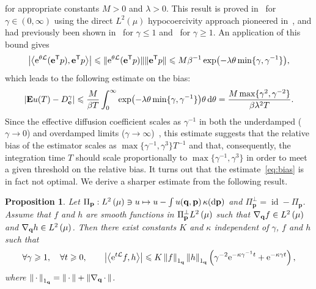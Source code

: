 \documentclass[11pt,a4paper]{article}
\DeclareMathOperator{\id}{id}
\newcommand{\e}{\mathrm{e}}
\newcommand{\dummy}{\,\cdot\,}
\newcommand{\expect}[0]{\mathbf{E}}
\newcommand{\grad}{\nabla}
\newcommand{\vect}[1]{\boldsymbol{\mathbf #1}}
\renewcommand{\d}{\mathrm d}
\renewcommand{\t}{\mathsf T}
\theoremstyle{plain}
\newtheorem{proposition}{Proposition}[section]
\numberwithin{equation}{section}
\renewcommand{\leq}{\leqslant}
\renewcommand{\geq}{\geqslant}
\begin{document}
for appropriate constants $M > 0$ and $\lambda > 0$.
This result is proved in~\cite{roussel2018spectral} for $\gamma \in (0, \infty)$ using the direct $L^2(\mu)$ hypocoercivity approach pioneered in~\cite{MR2576899,MR3324910},
and had previously been shown in~\cite{MR2394704} for $\gamma \leq 1$ and~\cite{LMS16} for $\gamma \geq 1$.
An application of this bound gives
\[
    \left\lvert \ip{\e^{\theta \mathcal L}(\vect e^\t p)}{\vect e^\t p} \right\rvert
    \leq \norm*{\e^{\theta \mathcal L}(\vect e^\t p)} \norm*{\vect e^\t p}
    \leq M \beta^{-1} \exp\bigl(- \lambda \theta \min\{\gamma, \gamma^{-1}\}\bigr),
\]
which leads to the following estimate on the bias:
\begin{equation}
    \label{eq:bias}
    \abs{\expect u(T) - D_{\vect e}^{\gamma}}
    \leq \frac{M}{\beta T}\int_{0}^{\infty} \exp\bigl(- \lambda \theta \min\{\gamma, \gamma^{-1}\}\bigr) \theta \, \d \theta
    = \frac{M \max \{\gamma^2, \gamma^{-2}\}}{\beta \lambda^2 T}.
\end{equation}
Since the effective diffusion coefficient scales as $\gamma^{-1}$ in both the underdamped ($\gamma \to 0$) and overdamped limits ($\gamma \to \infty$)~\cite{MR2394704,MR2427108},
this estimate suggests that the relative bias of the estimator scales as $\max\{\gamma^{-1}, \gamma^3\} T^{-1}$ and that,
consequently, the integration time $T$ should scale proportionally to $\max\{\gamma^{-1}, \gamma^3\}$ in order to meet a given threshold on the relative bias.
It turns out that the estimate~\eqref{eq:bias} is in fact not optimal.
We derive a sharper estimate from the following result.
\begin{proposition}
    \label{proposition:semigroup_meanzero_observable}
    Let $\Pi_{\vect p}: \lp{2}{\mu} \ni u \mapsto  u - \int u(\vect q, \vect p) \, \kappa(\d \vect p)$ and $\Pi_{\vect p}^\perp = \id - \Pi_{\vect p}$.
    Assume that $f$ and $h$ are smooth functions in $\Pi_{\vect p}^\perp \lp{2}{\mu}$
    such that $\grad_{\vect q} f \in \lp{2}{\mu}$ and $\grad_{\vect q} h \in \lp{2}{\mu}$.
    Then there exist constants $K$ and $\kappa$ independent of $\gamma$, $f$ and $h$ such that
    \begin{equation}
        \label{eq:optimal_decay_correlation}
        \forall \gamma \geq 1, \quad
        \forall t \geq 0, \qquad
        \abs{\ip{\e^{t \mathcal L}f}{h}}
        \leq K \norm{f}[1_{\vect q}]  \norm{h}[1_{\vect q}] \left( \gamma^{-2} \e^{- \kappa \gamma^{-1} t} + \e^{-\kappa  \gamma t} \right),
    \end{equation}
    where $\norm{\dummy}[1_{\vect q}] = \norm{\dummy} + \norm{\grad_{\vect q} \dummy}$.
\end{proposition}
\end{document}
